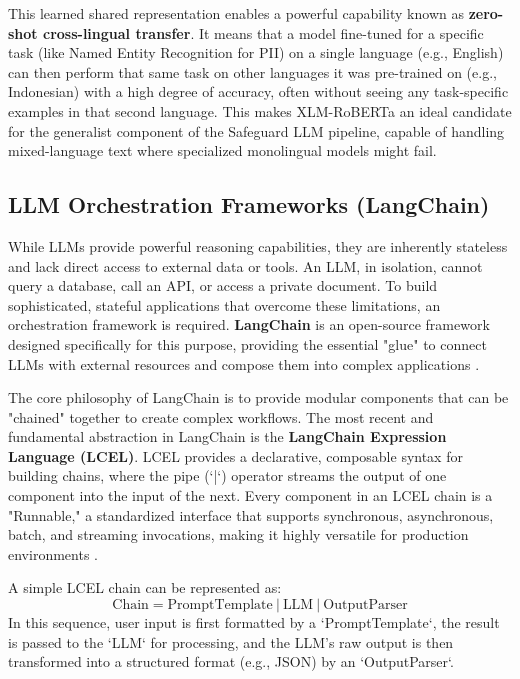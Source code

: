 This learned shared representation enables a powerful capability known as \textbf{zero-shot cross-lingual transfer}. It means that a model fine-tuned for a specific task (like Named Entity Recognition for PII) on a single language (e.g., English) can then perform that same task on other languages it was pre-trained on (e.g., Indonesian) with a high degree of accuracy, often without seeing any task-specific examples in that second language. This makes XLM-RoBERTa an ideal candidate for the generalist component of the Safeguard LLM pipeline, capable of handling mixed-language text where specialized monolingual models might fail.


\subsection{LLM Orchestration Frameworks (LangChain)}
\label{subsec:langchain}

While LLMs provide powerful reasoning capabilities, they are inherently stateless and lack direct access to external data or tools. An LLM, in isolation, cannot query a database, call an API, or access a private document. To build sophisticated, stateful applications that overcome these limitations, an orchestration framework is required. \textbf{LangChain} is an open-source framework designed specifically for this purpose, providing the essential "glue" to connect LLMs with external resources and compose them into complex applications \cite{FIND_CITATION_PLEASE}.

The core philosophy of LangChain is to provide modular components that can be "chained" together to create complex workflows. The most recent and fundamental abstraction in LangChain is the \textbf{LangChain Expression Language (LCEL)}. LCEL provides a declarative, composable syntax for building chains, where the pipe (`|`) operator streams the output of one component into the input of the next. Every component in an LCEL chain is a "Runnable," a standardized interface that supports synchronous, asynchronous, batch, and streaming invocations, making it highly versatile for production environments \cite{FIND_CITATION_PLEASE}.

A simple LCEL chain can be represented as:
$$ \text{Chain} = \text{PromptTemplate} \ | \ \text{LLM} \ | \ \text{OutputParser} $$
In this sequence, user input is first formatted by a `PromptTemplate`, the result is passed to the `LLM` for processing, and the LLM's raw output is then transformed into a structured format (e.g., JSON) by an `OutputParser`.

